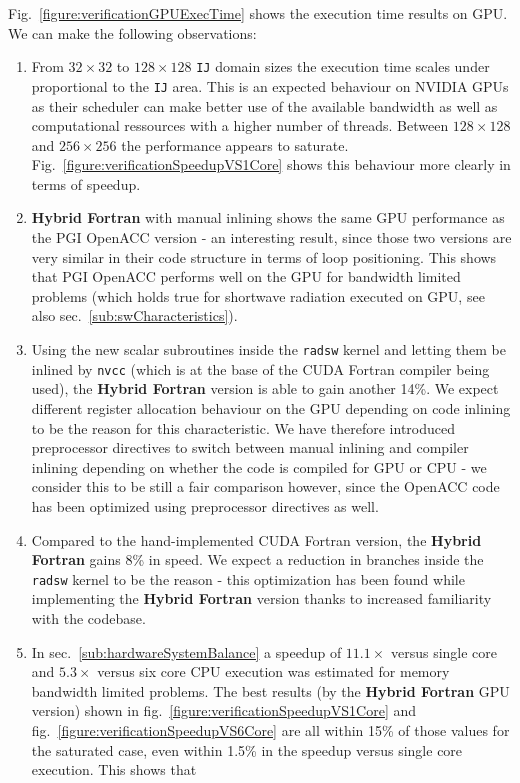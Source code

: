 Fig.~\ref{figure:verificationGPUExecTime} shows the execution time results on GPU. We can make the following observations: 
\begin{enumerate}
 \item From $32\times32$ to $128\times128$ \verb|IJ| domain sizes the execution time scales under proportional to the \verb|IJ| area. This is an expected behaviour on NVIDIA GPUs as their scheduler can make better use of the available bandwidth as well as computational ressources with a higher number of threads. Between $128\times128$ and $256\times256$ the performance appears to saturate. Fig.~\ref{figure:verificationSpeedupVS1Core} shows this behaviour more clearly in terms of speedup. 
 \item \textbf{Hybrid Fortran} with manual inlining shows the same GPU performance as the PGI OpenACC version - an interesting result, since those two versions are very similar in their code structure in terms of loop positioning. This shows that PGI OpenACC performs well on the GPU for bandwidth limited problems (which holds true for shortwave radiation executed on GPU, see also sec.~\ref{sub:swCharacteristics}).
 \item Using the new scalar subroutines inside the \verb|radsw| kernel and letting them be inlined by \verb|nvcc| (which is at the base of the CUDA Fortran compiler being used), the \textbf{Hybrid Fortran} version is able to gain another 14\%. We expect different register allocation behaviour on the GPU depending on code inlining to be the reason for this characteristic. We have therefore introduced preprocessor directives to switch between manual inlining and compiler inlining depending on whether the code is compiled for GPU or CPU - we consider this to be still a fair comparison however, since the OpenACC code has been optimized using preprocessor directives as well.
 \item Compared to the hand-implemented CUDA Fortran version, the \textbf{Hybrid Fortran} gains 8\% in speed. We expect a reduction in branches inside the \verb|radsw| kernel to be the reason - this optimization has been found while implementing the \textbf{Hybrid Fortran} version thanks to increased familiarity with the codebase.
 \item In sec.~\ref{sub:hardwareSystemBalance} a speedup of $11.1\times$ versus single core and $5.3\times$ versus six core CPU execution was estimated for memory bandwidth limited problems. The best results (by the \textbf{Hybrid Fortran} GPU version) shown in fig.~\ref{figure:verificationSpeedupVS1Core} and fig.~\ref{figure:verificationSpeedupVS6Core} are all within 15\% of those values for the saturated case, even within 1.5\% in the speedup versus single core execution. This shows that

\end{enumerate}
